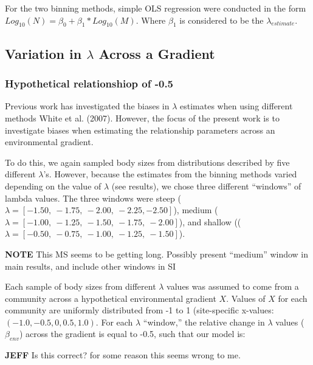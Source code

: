 \documentclass[
]{article}
\begin{document}
For the two binning methods, simple OLS regression were conducted in the
form \(Log_{10}(N) = \beta_0 + \beta_1 * Log_{10}(M)\). Where
\(\beta_{1}\) is considered to be the \(\lambda_{estimate}\).

\hypertarget{variation-in-lambda-across-a-gradient}{%
\subsection{\texorpdfstring{Variation in \(\lambda\) Across a
Gradient}{Variation in \textbackslash lambda Across a Gradient}}\label{variation-in-lambda-across-a-gradient}}

\hypertarget{hypothetical-relationshiop-of--0.5}{%
\subsubsection{Hypothetical relationshiop of
-0.5}\label{hypothetical-relationshiop-of--0.5}}

Previous work has investigated the biases in \(\lambda\) estimates when
using different methods White et al. (2007). However, the focus of the
present work is to investigate biases when estimating the relationship
parameters across an environmental gradient.

To do this, we again sampled body sizes from distributions described by
five different \(\lambda\)'s. However, because the estimates from the
binning methods varied depending on the value of \(\lambda\) (see
results), we chose three different ``windows'' of lambda values. The
three windows were steep
(\(\lambda = [-1.50,~ -1.75,~ -2.00,~ -2.25, -2.50]\)), medium
(\(\lambda = [-1.00,~ -1.25,~ -1.50,~ -1.75,~ -2.00]\)), and shallow
((\(\lambda = [-0.50,~ -0.75,~ -1.00,~ -1.25,~ -1.50]\)).

\textbf{NOTE} This MS seems to be getting long. Possibly present
``medium'' window in main results, and include other windows in SI

Each sample of body sizes from different \(\lambda\) values was assumed
to come from a community across a hypothetical environmental gradient
\(X\). Values of \(X\) for each community are uniformly distributed from
-1 to 1 (site-specific x-values: \((-1.0, -0.5, 0, 0.5, 1.0)\). For each
\(\lambda\) ``window,'' the relative change in \(\lambda\) values
(\(\beta_{env}\)) across the gradient is equal to -0.5, such that our
model is:

\textbf{JEFF} Is this correct? for some reason this seems wrong to me.
\end{document}
